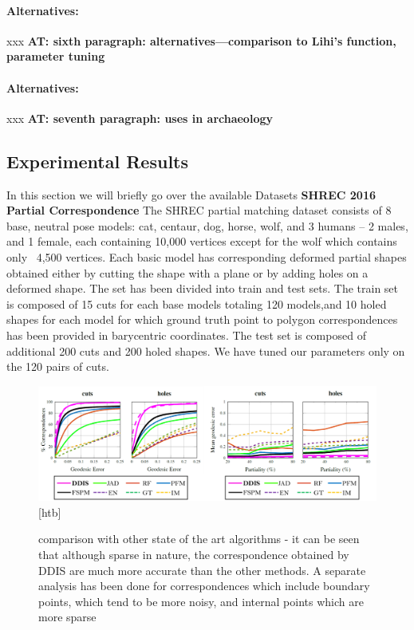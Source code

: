 \documentclass[10pt,twocolumn,letterpaper]{article}
\newcommand{\colornote}[3]{{\color{#1}\bf{#2: #3}\normalfont}}
\newcommand{\colornote}[3]{}
\newcommand {\ayellet}[1]{\colornote{blue}{AT}{#1}}
\begin{document}
\paragraph{Alternatives:} xxx
\ayellet{sixth paragraph: alternatives---comparison to Lihi's function, parameter tuning}
\paragraph{Alternatives:} xxx
\ayellet{seventh paragraph: uses in archaeology}

\subsection{Experimental Results}
In this section we will briefly go over the available Datasets
\textbf{SHREC 2016 Partial Correspondence}  
The SHREC partial matching dataset\cite{cosmo2016shrec} consists of 8 base, neutral pose models: cat, centaur, dog, horse, wolf, and 3 humans – 2 males, and 1 female, each containing 10,000 vertices except for the wolf which contains only ~4,500 vertices. Each basic model has corresponding deformed partial shapes obtained either by cutting the shape with a plane or by adding holes on a deformed shape. The set has been divided into train and test sets. The train set is composed of 15 cuts for each base models totaling 120 models,and 10 holed shapes for each model for which ground truth point to polygon correspondences has been provided in barycentric coordinates. The test set is composed of additional 200 cuts and 200 holed shapes. We have tuned our parameters only on the 120 pairs of cuts.

\begin{figure}[htb]
	\centering

	\includegraphics[width=1\textwidth]{figures/ROCSHREC16.png}[htb]
	\caption{comparison with other state of the art algorithms - it can be seen that although sparse in nature, the correspondence obtained by DDIS are much more accurate than the other methods. 
		A separate analysis has been done for correspondences which include boundary points, which tend to be more noisy, and internal points which are more sparse}
\end{figure}
\end{document}
